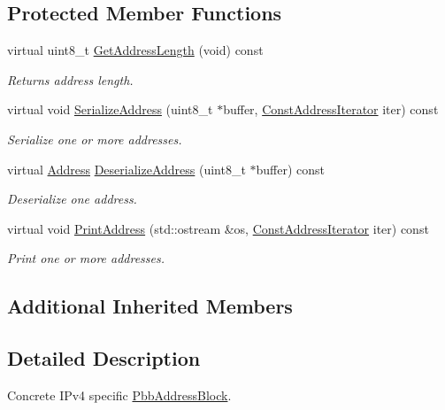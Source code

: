 \subsection*{Protected Member Functions}
\begin{DoxyCompactItemize}
\item 
virtual uint8\+\_\+t \hyperlink{classns3_1_1PbbAddressBlockIpv4_a75ba53371653c6be60f0ce5b10454474}{Get\+Address\+Length} (void) const 
\begin{DoxyCompactList}\small\item\em Returns address length. \end{DoxyCompactList}\item 
virtual void \hyperlink{classns3_1_1PbbAddressBlockIpv4_ad8981ced0f4a4e7ecc7d2e0db290e09d}{Serialize\+Address} (uint8\+\_\+t $\ast$buffer, \hyperlink{classns3_1_1PbbAddressBlock_ac1f10df8f85c0c8d4b729352bc32a7cf}{Const\+Address\+Iterator} iter) const 
\begin{DoxyCompactList}\small\item\em Serialize one or more addresses. \end{DoxyCompactList}\item 
virtual \hyperlink{classns3_1_1Address}{Address} \hyperlink{classns3_1_1PbbAddressBlockIpv4_ada1a4a8ce0032f74d56c158873145886}{Deserialize\+Address} (uint8\+\_\+t $\ast$buffer) const 
\begin{DoxyCompactList}\small\item\em Deserialize one address. \end{DoxyCompactList}\item 
virtual void \hyperlink{classns3_1_1PbbAddressBlockIpv4_a639fc465d48da3a9198801cd02d38d97}{Print\+Address} (std\+::ostream \&os, \hyperlink{classns3_1_1PbbAddressBlock_ac1f10df8f85c0c8d4b729352bc32a7cf}{Const\+Address\+Iterator} iter) const 
\begin{DoxyCompactList}\small\item\em Print one or more addresses. \end{DoxyCompactList}\end{DoxyCompactItemize}
\subsection*{Additional Inherited Members}


\subsection{Detailed Description}
Concrete I\+Pv4 specific \hyperlink{classns3_1_1PbbAddressBlock}{Pbb\+Address\+Block}. 


